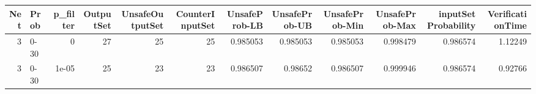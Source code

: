 \begin{tabular}{rlrrrrrrrrrr}
\hline
   Net & Prob   &   p\_filter &   OutputSet &   UnsafeOutputSet &   CounterInputSet &   UnsafeProb-LB &   UnsafeProb-UB &   UnsafeProb-Min &   UnsafeProb-Max &   inputSet Probability &   VerificationTime \\
\hline
     3 & 0-30   &      0     &          27 &                25 &                25 &        0.985053 &        0.985053 &         0.985053 &         0.998479 &               0.986574 &            1.12249 \\
     3 & 0-30   &      1e-05 &          25 &                23 &                23 &        0.986507 &        0.98652  &         0.986507 &         0.999946 &               0.986574 &            0.92766 \\
\hline
\end{tabular}

